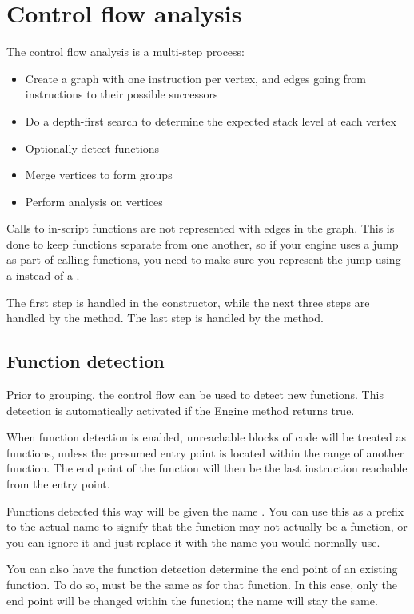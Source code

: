 \section{Control flow analysis}

The control flow analysis is a multi-step process:

\begin{itemize}
\item Create a graph with one instruction per vertex, and edges going from instructions to their possible successors
\item Do a depth-first search to determine the expected stack level at each vertex
\item Optionally detect functions
\item Merge vertices to form groups
\item Perform analysis on vertices
\end{itemize}

Calls to in-script functions are not represented with edges in the graph. This is done to keep functions separate from one another, so if your engine uses a jump as part of calling functions, you need to make sure you represent the jump using a  instead of a .

The first step is handled in the constructor, while the next three steps are handled by the  method. The last step is handled by the  method.

\subsection{Function detection}
\label{sec:autofunc}
Prior to grouping, the control flow can be used to detect new functions. This detection is automatically activated if the Engine method  returns true.

When function detection is enabled, unreachable blocks of code will be treated as functions, unless the presumed entry point is located within the range of another function. The end point of the function will then be the last instruction reachable from the entry point.

Functions detected this way will be given the name . You can use this as a prefix to the actual name to signify that the function may not actually be a function, or you can ignore it and just replace it with the name you would normally use.

You can also have the function detection determine the end point of an existing function. To do so,  must be the same as  for that function. In this case, only the end point will be changed within the function; the name will stay the same.

